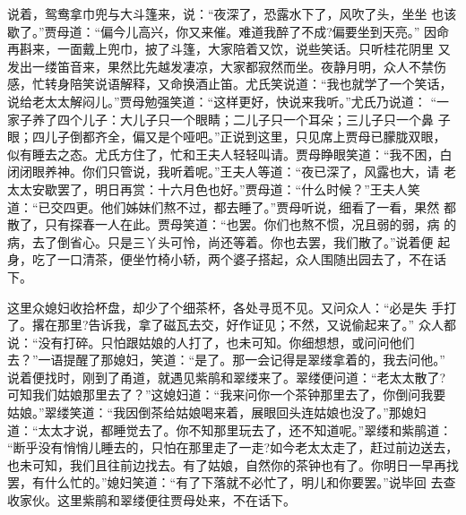 说着，鸳鸯拿巾兜与大斗篷来，说：“夜深了，恐露水下了，风吹了头，坐坐
也该歇了。”贾母道：“偏今儿高兴，你又来催。难道我醉了不成?偏要坐到天亮。”
因命再斟来，一面戴上兜巾，披了斗篷，大家陪着又饮，说些笑话。只听桂花阴里
又发出一缕笛音来，果然比先越发凄凉，大家都寂然而坐。夜静月明，众人不禁伤
感，忙转身陪笑说语解释，又命换酒止笛。尤氏笑说道：“我也就学了一个笑话，
说给老太太解闷儿。”贾母勉强笑道：“这样更好，快说来我听。”尤氏乃说道：
“一家子养了四个儿子：大儿子只一个眼睛；二儿子只一个耳朵；三儿子只一个鼻
子眼；四儿子倒都齐全，偏又是个哑吧。”正说到这里，只见席上贾母已朦胧双眼，
似有睡去之态。尤氏方住了，忙和王夫人轻轻叫请。贾母睁眼笑道：“我不困，白
闭闭眼养神。你们只管说，我听着呢。”王夫人等道：“夜已深了，风露也大，请
老太太安歇罢了，明日再赏：十六月色也好。”贾母道：“什么时候？”王夫人笑
道：“已交四更。他们姊妹们熬不过，都去睡了。”贾母听说，细看了一看，果然
都散了，只有探春一人在此。贾母笑道：“也罢。你们也熬不惯，况且弱的弱，病
的病，去了倒省心。只是三丫头可怜，尚还等着。你也去罢，我们散了。”说着便
起身，吃了一口清茶，便坐竹椅小轿，两个婆子搭起，众人围随出园去了，不在话
下。

这里众媳妇收拾杯盘，却少了个细茶杯，各处寻觅不见。又问众人：“必是失
手打了。撂在那里?告诉我，拿了磁瓦去交，好作证见；不然，又说偷起来了。”
众人都说：“没有打碎。只怕跟姑娘的人打了，也未可知。你细想想，或问问他们
去？”一语提醒了那媳妇，笑道：“是了。那一会记得是翠缕拿着的，我去问他。”
说着便找时，刚到了甬道，就遇见紫鹃和翠缕来了。翠缕便问道：“老太太散了?
可知我们姑娘那里去了？”这媳妇道：“我来问你一个茶钟那里去了，你倒问我要
姑娘。”翠缕笑道：“我因倒茶给姑娘喝来着，展眼回头连姑娘也没了。”那媳妇
道：“太太才说，都睡觉去了。你不知那里玩去了，还不知道呢。”翠缕和紫鹃道：
“断乎没有悄悄儿睡去的，只怕在那里走了一走?如今老太太走了，赶过前边送去，
也未可知，我们且往前边找去。有了姑娘，自然你的茶钟也有了。你明日一早再找
罢，有什么忙的。”媳妇笑道：“有了下落就不必忙了，明儿和你要罢。”说毕回
去查收家伙。这里紫鹃和翠缕便往贾母处来，不在话下。

